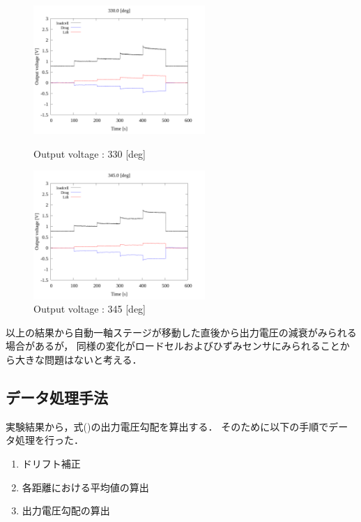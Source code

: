 \begin{figure}[htbp]
      \begin{minipage}[b]{0.45\linewidth}
        \centering
        \includegraphics[width=65mm]{../../02_workspace/result/2-1/plot/01-3_allsensors/01_allsensors_3300.png}
        \caption{Output voltage : 330 [deg]}
      \end{minipage}
      \begin{minipage}[b]{0.45\linewidth}
        \centering
        \includegraphics[width=65mm]{../../02_workspace/result/2-1/plot/01-3_allsensors/01_allsensors_3450.png}
        \caption{Output voltage : 345 [deg]}
      \end{minipage}
\end{figure}

\newpage

以上の結果から自動一軸ステージが移動した直後から出力電圧の減衰がみられる場合があるが，
同様の変化がロードセルおよびひずみセンサにみられることから大きな問題はないと考える．

\subsection{データ処理手法}

実験結果から，式()の出力電圧勾配を算出する．
そのために以下の手順でデータ処理を行った．

\begin{enumerate}[2.3.1]
	\item ドリフト補正
	\item 各距離における平均値の算出
	\item 出力電圧勾配の算出
\end{enumerate}

